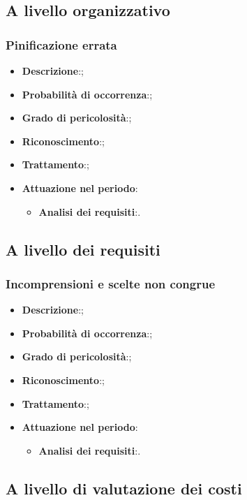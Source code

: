 	\subsection{A livello organizzativo}
		
		\subsubsection{Pinificazione errata}
		\begin{itemize}
			\item \textbf{Descrizione}:;
			\item \textbf{Probabilità di occorrenza}:;
			\item \textbf{Grado di pericolosità}:;
			\item \textbf{Riconoscimento}:;	
			\item \textbf{Trattamento}:;
			\item \textbf{Attuazione nel periodo}:
			\begin{itemize}
				\item \textbf{Analisi dei requisiti}:.
			\end{itemize}
		\end{itemize}
	
	\subsection{A livello dei requisiti}
	
		\subsubsection{Incomprensioni e scelte non congrue}
		\begin{itemize}
			\item \textbf{Descrizione}:;
			\item \textbf{Probabilità di occorrenza}:;
			\item \textbf{Grado di pericolosità}:;
			\item \textbf{Riconoscimento}:;	
			\item \textbf{Trattamento}:;
			\item \textbf{Attuazione nel periodo}:
			\begin{itemize}
				\item \textbf{Analisi dei requisiti}:.
			\end{itemize}
		\end{itemize}
	
	\subsection{A livello di valutazione dei costi}
	
